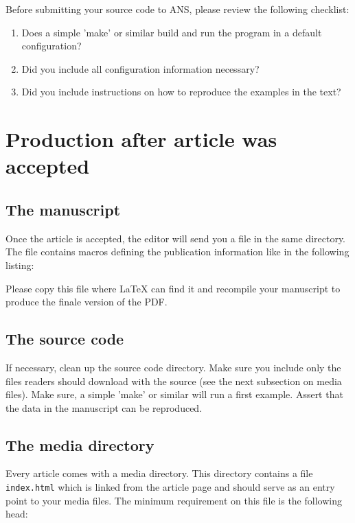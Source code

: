 \documentclass{ansarticle}
\begin{document}
Before submitting your source code to ANS, please review the following
checklist:
\begin{enumerate}
\item Does a simple 'make' or similar build and run the program in a
  default configuration?
\item Did you include all configuration information necessary?
\item Did you include instructions on how to reproduce the examples in
  the text?
\end{enumerate}

\section{Production after article was accepted}

\subsection{The manuscript}

Once the article is accepted, the editor will send you a file
 in the same directory. The file contains macros
defining the publication information like in the following listing:


Please copy this file where \LaTeX{} can find it and recompile your
manuscript to produce the finale version of the PDF.

\subsection{The source code}

If necessary, clean up the source code directory. Make sure you
include only the files readers should download with the source (see
the next subsection on media files). Make sure, a simple 'make' or
similar will run a first example. Assert that the data in the
manuscript can be reproduced.

\subsection{The media directory}

Every article comes with a media directory. This directory contains a
file \texttt{index.html} which is linked from the article page and
should serve as an entry point to your media files. The minimum
requirement on this file is the following head:
\end{document}
